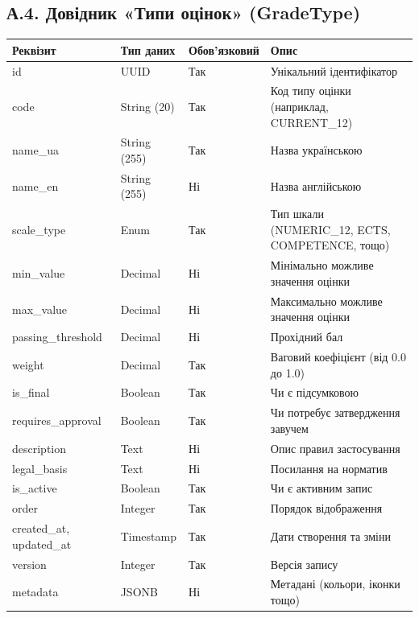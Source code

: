 \documentclass{article}
\begin{document}
\begin{appendix}
\subsection{А.4. Довідник «Типи оцінок» (GradeType)}
\begin{longtable}{p{3.5cm}p{3cm}p{2cm}p{5.5cm}}
\toprule
\textbf{Реквізит} & \textbf{Тип даних} & \textbf{Обов'язковий} & \textbf{Опис} \\
\midrule
id & UUID & Так & Унікальний ідентифікатор \\
code & String (20) & Так & Код типу оцінки (наприклад, CURRENT\_12) \\
name\_ua & String (255) & Так & Назва українською \\
name\_en & String (255) & Ні & Назва англійською \\
scale\_type & Enum & Так & Тип шкали (NUMERIC\_12, ECTS, COMPETENCE, тощо) \\
min\_value & Decimal & Ні & Мінімально можливе значення оцінки \\
max\_value & Decimal & Ні & Максимально можливе значення оцінки \\
passing\_threshold & Decimal & Ні & Прохідний бал \\
weight & Decimal & Так & Ваговий коефіцієнт (від 0.0 до 1.0) \\
is\_final & Boolean & Так & Чи є підсумковою \\
requires\_approval & Boolean & Так & Чи потребує затвердження завучем \\
description & Text & Ні & Опис правил застосування \\
legal\_basis & Text & Ні & Посилання на норматив \\
is\_active & Boolean & Так & Чи є активним запис \\
order & Integer & Так & Порядок відображення \\
created\_at, updated\_at & Timestamp & Так & Дати створення та зміни \\
version & Integer & Так & Версія запису \\
metadata & JSONB & Ні & Метадані (кольори, іконки тощо) \\
\bottomrule
\end{longtable}


\end{appendix}
\end{document}
